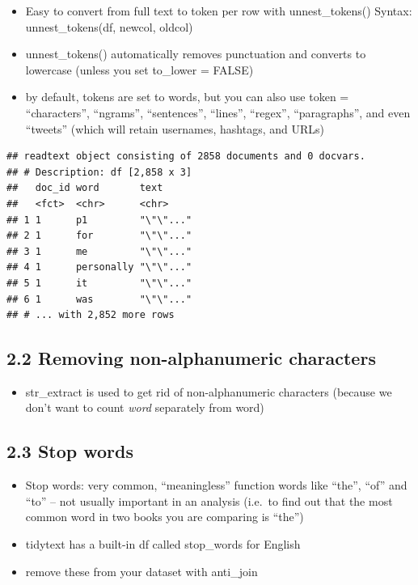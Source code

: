 \documentclass[a4paper, nobind]{templates/ociamthesis}
\providecommand{\tightlist}{%
  \setlength{\itemsep}{0pt}\setlength{\parskip}{0pt}}
\begin{document}
\begin{itemize}
\tightlist
\item
  Easy to convert from full text to token per row with unnest\_tokens()
  Syntax: unnest\_tokens(df, newcol, oldcol)
\item
  unnest\_tokens() automatically removes punctuation and converts to lowercase (unless you set to\_lower = FALSE)
\item
  by default, tokens are set to words, but you can also use token = ``characters'', ``ngrams'', ``sentences'', ``lines'', ``regex'', ``paragraphs'', and even ``tweets'' (which will retain usernames, hashtags, and URLs)
\end{itemize}

\begin{verbatim}
## readtext object consisting of 2858 documents and 0 docvars.
## # Description: df [2,858 x 3]
##   doc_id word       text     
##   <fct>  <chr>      <chr>    
## 1 1      p1         "\"\"..."
## 2 1      for        "\"\"..."
## 3 1      me         "\"\"..."
## 4 1      personally "\"\"..."
## 5 1      it         "\"\"..."
## 6 1      was        "\"\"..."
## # ... with 2,852 more rows
\end{verbatim}

\hypertarget{removing-non-alphanumeric-characters}{%
\subsection{2.2 Removing non-alphanumeric characters}\label{removing-non-alphanumeric-characters}}

\begin{itemize}
\tightlist
\item
  str\_extract is used to get rid of non-alphanumeric characters (because we don't want to count \emph{word} separately from word)
\end{itemize}

\hypertarget{stop-words}{%
\subsection{2.3 Stop words}\label{stop-words}}

\begin{itemize}
\tightlist
\item
  Stop words: very common, ``meaningless'' function words like ``the'', ``of'' and ``to'' -- not usually important in an analysis (i.e.~to find out that the most common word in two books you are comparing is ``the'')
\item
  tidytext has a built-in df called stop\_words for English
\item
  remove these from your dataset with anti\_join
\end{itemize}
\end{document}
